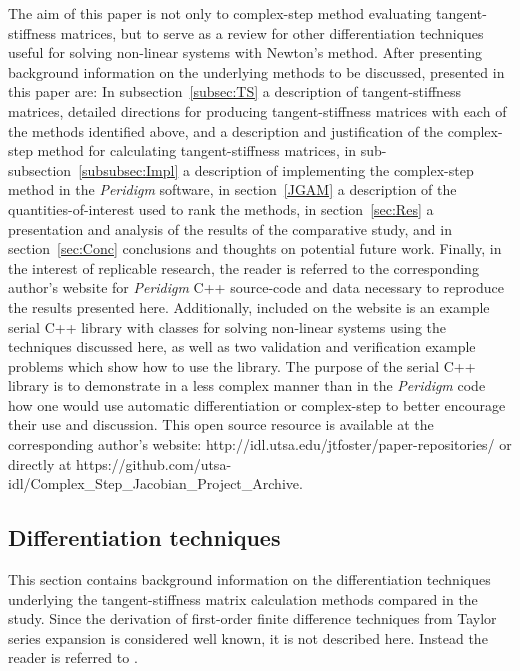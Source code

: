 \documentclass[preprint,12pt]{elsarticle}
\begin{document}
The aim of this paper is not only to  complex-step method  evaluating tangent-stiffness matrices, but to serve as a review
for other differentiation techniques useful for solving non-linear systems with
Newton's method. After presenting background information on the underlying
methods to be discussed, presented in this paper are: In subsection~\ref{subsec:TS} a description of
tangent-stiffness matrices, detailed directions for producing
tangent-stiffness matrices with each of the methods identified above, and a
description and justification of the complex-step method for calculating
tangent-stiffness matrices, in sub-subsection~\ref{subsubsec:Impl} a description of implementing the complex-step method in
the \emph{Peridigm} software, in section~\ref{JGAM} a description of the quantities-of-interest
used to rank the methods, in section~\ref{sec:Res} a presentation and analysis of the results of the
comparative study, and in section~\ref{sec:Conc} conclusions and thoughts on potential future work.
Finally, in the interest of replicable research, the reader is referred to the
corresponding author's website for \emph{Peridigm} C++ source-code and data
necessary to reproduce the results presented here. Additionally, included on
the website is an example serial C++ library with classes for solving
non-linear systems using the techniques discussed here, as well as two
validation and verification example problems which show how to use the library.
The purpose of the serial C++ library is to demonstrate in a less complex
manner than in the \emph{Peridigm} code how one would use
automatic differentiation or complex-step to better encourage their use and
discussion. This open source resource is available at the corresponding author's website: http://idl.utsa.edu/jtfoster/paper-repositories/
or directly at https://github.com/utsa-idl/Complex_Step_Jacobian_Project_Archive.

\subsection{Differentiation techniques}

This section contains background information on the differentiation techniques
underlying the tangent-stiffness matrix calculation methods compared in the
study. Since the derivation of first-order finite difference techniques from
Taylor series expansion is considered well known, it is not described here.
Instead the reader is referred to \cite[Chap. 4.1.3]{chapra2010}.
\end{document}
